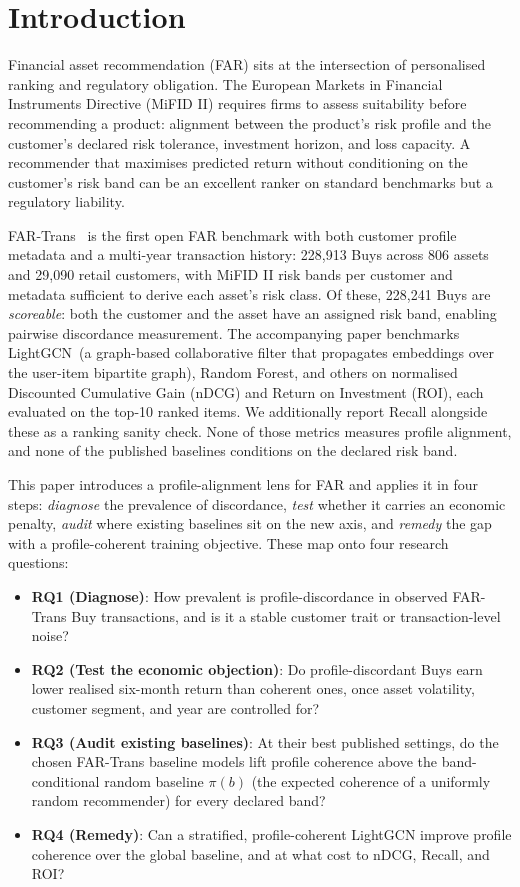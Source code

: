 \section{Introduction}
\label{sec:intro}

Financial asset recommendation (FAR) sits at the intersection of personalised ranking and regulatory obligation. The European Markets in Financial Instruments Directive (MiFID II) requires firms to assess suitability before recommending a product: alignment between the product's risk profile and the customer's declared risk tolerance, investment horizon, and loss capacity. A recommender that maximises predicted return without conditioning on the customer's risk band can be an excellent ranker on standard benchmarks but a regulatory liability.

FAR-Trans~\cite{sanzcruzado:fartrans} is the first open FAR benchmark with both customer profile metadata and a multi-year transaction history: 228{,}913 Buys across 806 assets and 29{,}090 retail customers, with MiFID II risk bands per customer and metadata sufficient to derive each asset's risk class. Of these, 228{,}241 Buys are \emph{scoreable}: both the customer and the asset have an assigned risk band, enabling pairwise discordance measurement. The accompanying paper benchmarks LightGCN~(a graph-based collaborative filter that propagates embeddings over the user-item bipartite graph), Random Forest, and others on normalised Discounted Cumulative Gain (nDCG) and Return on Investment (ROI), each evaluated on the top-10 ranked items. We additionally report Recall alongside these as a ranking sanity check. None of those metrics measures profile alignment, and none of the published baselines conditions on the declared risk band.

This paper introduces a profile-alignment lens for FAR and applies it in four steps: \emph{diagnose} the prevalence of discordance, \emph{test} whether it carries an economic penalty, \emph{audit} where existing baselines sit on the new axis, and \emph{remedy} the gap with a profile-coherent training objective. These map onto four research questions:

\begin{itemize}
    \item \textbf{RQ1 (Diagnose)}: How prevalent is profile-discordance in observed FAR-Trans Buy transactions, and is it a stable customer trait or transaction-level noise?
    \item \textbf{RQ2 (Test the economic objection)}: Do profile-discordant Buys earn lower realised six-month return than coherent ones, once asset volatility, customer segment, and year are controlled for?
    \item \textbf{RQ3 (Audit existing baselines)}: At their best published settings, do the chosen FAR-Trans baseline models lift profile coherence above the band-conditional random baseline $\pi(b)$ (the expected coherence of a uniformly random recommender) for every declared band?
    \item \textbf{RQ4 (Remedy)}: Can a stratified, profile-coherent LightGCN improve profile coherence over the global baseline, and at what cost to nDCG, Recall, and ROI?
\end{itemize}

